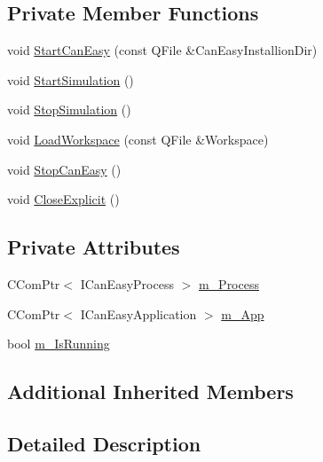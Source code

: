 \subsection*{Private Member Functions}
\begin{DoxyCompactItemize}
\item 
void \hyperlink{class_r_w_1_1_c_o_r_e_1_1_can_easy_wrapper_a3dd585f435f8249429a1cd6c60f52037}{Start\+Can\+Easy} (const Q\+File \&Can\+Easy\+Installion\+Dir)
\item 
void \hyperlink{class_r_w_1_1_c_o_r_e_1_1_can_easy_wrapper_ad0bab30da2a3b67c624b82c0696d0d22}{Start\+Simulation} ()
\item 
void \hyperlink{class_r_w_1_1_c_o_r_e_1_1_can_easy_wrapper_a05dfab9becd44083a684df4e5f263b3d}{Stop\+Simulation} ()
\item 
void \hyperlink{class_r_w_1_1_c_o_r_e_1_1_can_easy_wrapper_aad31305e358aaaa21bfb93aeab5a3b33}{Load\+Workspace} (const Q\+File \&Workspace)
\item 
void \hyperlink{class_r_w_1_1_c_o_r_e_1_1_can_easy_wrapper_a2cdc4ca7e44bb4305455460743cf2496}{Stop\+Can\+Easy} ()
\item 
void \hyperlink{class_r_w_1_1_c_o_r_e_1_1_can_easy_wrapper_ab70adb2dc78f160412ec155c4ead3f15}{Close\+Explicit} ()
\end{DoxyCompactItemize}
\subsection*{Private Attributes}
\begin{DoxyCompactItemize}
\item 
C\+Com\+Ptr$<$ I\+Can\+Easy\+Process $>$ \hyperlink{class_r_w_1_1_c_o_r_e_1_1_can_easy_wrapper_ac2ed85324d592c81e797426cef3d600e}{m\+\_\+\+Process}
\item 
C\+Com\+Ptr$<$ I\+Can\+Easy\+Application $>$ \hyperlink{class_r_w_1_1_c_o_r_e_1_1_can_easy_wrapper_a263279df123f2f05d2752ccf6c62da18}{m\+\_\+\+App}
\item 
bool \hyperlink{class_r_w_1_1_c_o_r_e_1_1_can_easy_wrapper_a6bc2ad0752071fe7495bc971946a5a58}{m\+\_\+\+Is\+Running}
\end{DoxyCompactItemize}
\subsection*{Additional Inherited Members}


\subsection{Detailed Description}


